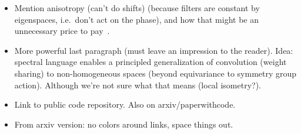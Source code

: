 \begin{itemize}
    \item Mention anisotropy (can't do shifts) (because filters are constant by eigenspaces, i.e.\ don't act on the phase), and how that might be an unnecessary price to pay~\cite{defferrard2020deepsphere}.
    \item More powerful last paragraph (must leave an impression to the reader). Idea: spectral language enables a principled generalization of convolution (weight sharing) to non-homogeneous spaces (beyond equivariance to symmetry group action). Although we're not sure what that means (local isometry?).
    \item Link to public code repository. Also on arxiv/paperwithcode.
    \item From arxiv version: no colors around links, space things out.
\end{itemize}
\clearpage
